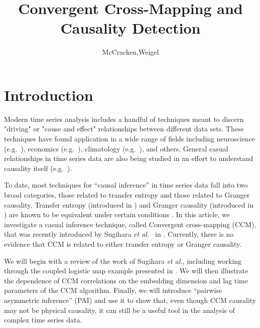 \documentclass[a4paper,11pt]{article}
\title{Convergent Cross-Mapping and Causality Detection}
\author{McCracken,Weigel}
\begin{document}
\maketitle


\section{Introduction}
Modern time series analysis includes a handful of techniques meant to discern "driving" or "cause and effect" relationships between different data sets.  These techniques have found application in a wide range of fields including neuroscience (e.g.\ \cite{Kaminski2001}), economics (e.g.\ \cite{dufour1998,dufour2006}), climatology (e.g.\ \cite{mosedale2006}), and others.  General casual relationships in time series data are also being studied in an effort to understand causality itself (e.g.\ \cite{eichler2012}).  

To date, most techniques for ``causal inference'' in time series data fall into two broad categories, those related to transfer entropy and those related to Granger causality.  Transfer entropy (introduced in \cite{Schreiber2000}) and Granger causality (introduced in \cite{granger1969}) are known to be equivalent under certain conditions \cite{Barnett2009}.  In this article, we investigate a casual inference technique, called Convergent cross-mapping (CCM), that was recently introduced by Sugihara {\em et al.\ } in \cite{Sugihara2012}.  Currently, there is no evidence that CCM is related to either transfer entropy or Granger causality.

We will begin with a review of the work of Sugihara {\em et al.}, including working through the coupled logistic map example presented in \cite{Sugihara2012}.  We will then illustrate the dependence of CCM correlations on the embedding dimension and lag time parameters of the CCM algorithm.  Finally, we will introduce ``pairwise asymmetric inference'' (PAI) and use it to show that, even though CCM causality may not be physical causality, it can still be a useful tool in the analysis of complex time series data.
\end{document}
